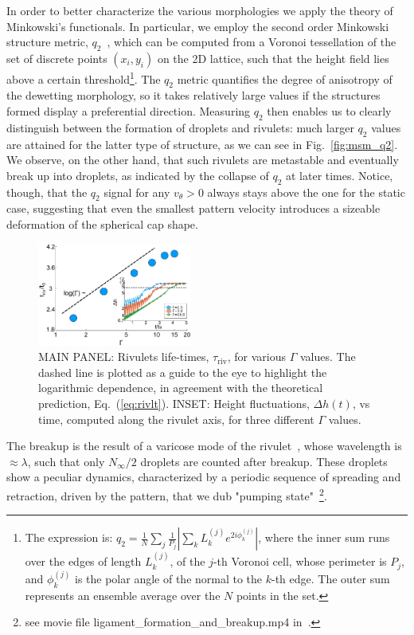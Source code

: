 \documentclass[twocolumn,amsmath,amssymb,showpacs,prl,superscriptaddress]{revtex4-1} %
\begin{document}
In order to better characterize the various morphologies we apply the theory of Minkowski's functionals. 
In particular, we employ the second order Minkowski structure metric, $q_2$~\cite{doi:10.1063/1.4774084, Schaller2020}, which can be computed from a Voronoi tessellation of the set of discrete points $(x_i, y_i)$ on the 2D lattice, such that the height field lies above a certain threshold\footnote{The expression is: $q_2 = \frac{1}{N}\sum_j \frac{1}{P_j}|\sum_k L^{(j)}_k e^{2i\phi^{(j)}_k}|$, where the inner sum runs over the edges of length $L^{(j)}_k$, of the $j$-th Voronoi cell, whose perimeter is $P_j$, and $\phi^{(j)}_k$ is the polar angle of the normal to the $k$-th edge. 
The outer sum represents an ensemble average over the $N$ points in the set.}. The $q_2$ metric quantifies the degree of anisotropy of the dewetting morphology, so it takes relatively large values if the structures formed display a preferential direction. 
Measuring $q_2$ then enables us to clearly distinguish between the formation of droplets and rivulets: much larger $q_2$ values are attained for the latter type of structure, as we can see in Fig.~\ref{fig:msm_q2}.
We observe, on the other hand, that such rivulets are metastable and eventually break up into droplets, as indicated by the collapse of $q_2$ at later times. 
Notice, though, that the $q_2$ signal for any $v_{\theta} >0$ always stays above the one for the static case, suggesting that even the smallest pattern velocity introduces a sizeable deformation of the spherical cap shape.
\begin{figure}
    \centering
    \includegraphics[width=0.45\textwidth]{Figure_5.pdf}
    \caption{MAIN PANEL: Rivulets life-times, $\tau_{\text{riv}}$, for various $\Gamma$ values.
    The dashed line is plotted as a guide to the eye to highlight the logarithmic dependence, in agreement with 
    the theoretical prediction, Eq.~(\ref{eq:rivlt}).
    INSET: Height fluctuations, $\Delta h(t)$, vs time, computed along the rivulet axis, for three different $\Gamma$ values.
    }
    \label{fig:stab_ligs_lam2}
\end{figure}
The breakup is the result of a varicose mode of the rivulet~\cite{doi:10.1063/1.3211248, PhysRevE.77.061605}, whose wavelength is $\approx\lambda$, such that only $N_{\infty}/2$ droplets are counted after breakup. 
These droplets show a peculiar dynamics, characterized by a periodic sequence of spreading and retraction, driven by the pattern, that we dub "pumping state"~\footnote{see movie file ligament\_formation\_and\_breakup.mp4 in~\cite{SuppMat}.}.
\end{document}
